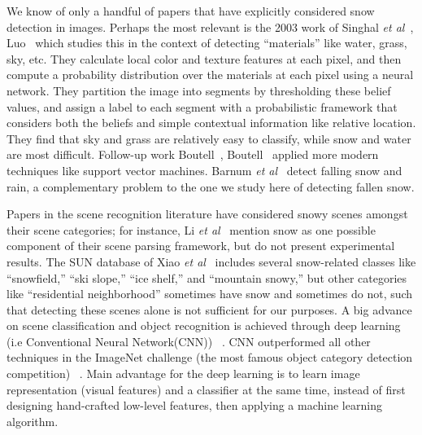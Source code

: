  We know of only a handful of
papers that have explicitly considered snow detection in
images. Perhaps the most relevant is the 2003 work of Singhal
\textit{et al}~\cite{singhal2003spatialcontext}, Luo\etal~\cite{luo2003spatialcontext}
which studies this in the context of detecting ``materials'' like
water, grass, sky, etc. They calculate local color and texture
features at each pixel, and then compute a probability
distribution over the materials at each pixel using a neural
network. They partition the image into segments by thresholding these
belief values, and assign a label to each segment with a probabilistic
framework that considers both the beliefs and simple
contextual information like relative location.
 They find that sky and grass
are relatively easy to classify, while snow and water are
most difficult.  Follow-up work Boutell\etal~\cite{boutell2006semanticfeature}, Boutell~\cite{boutell2005exploiting}
applied more modern techniques like
support vector machines.  Barnum \textit{et al}~\cite{rain2009IJCV}
detect falling snow and rain, a complementary problem
to the one we study here of detecting fallen
snow.

Papers in the scene recognition literature have considered
snowy scenes amongst their scene categories; for instance, Li \textit{et
  al}~\cite{li2009totalscene,li2007event} mention snow as one possible
component of their scene parsing framework, but do not present
experimental results. The SUN database of Xiao \textit{et
  al}~\cite{XiaoHEOT10} includes several snow-related classes like
``snowfield,'' ``ski slope,'' ``ice shelf,'' and ``mountain snowy,''
but other categories like ``residential neighborhood'' sometimes have
snow and sometimes do not, such that detecting these scenes alone
is not sufficient for our purposes. A big advance  on scene classification and object recognition is achieved through deep learning (i.e Conventional Neural Network(CNN)) ~\cite{krizhevsky2012imagenet,chatfield2011devil,zhou2014learning,grangier2009deep}. CNN outperformed all other techniques in the ImageNet challenge (the most famous object category detection competition) ~\cite{ILSVRCarxiv14}. Main advantage for the deep learning is to learn image representation (visual features) and a classifier at the same time, instead of first designing hand-crafted low-level features, then applying a machine learning algorithm. 







